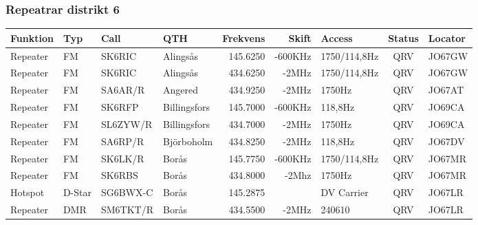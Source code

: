 \begin{landscape}
\subsubsection{Repeatrar distrikt 6}
\footnotesize
\begin{longtable}{llllrrlcl}
	\textbf{Funktion}         & \textbf{Typ}  & \textbf{Call} & \textbf{QTH}        & \textbf{Frekvens} & \textbf{Skift} & \textbf{Access}  & \textbf{Status} & \textbf{Locator} \\ \hline
	\endhead
	Repeater                  & FM            & SK6RIC        & Alingsås            & 145.6250          & -600KHz        & 1750/114,8Hz     & QRV             & JO67GW           \\
	Repeater                  & FM            & SK6RIC        & Alingsås            & 434.6250          & -2MHz          & 1750/114,8Hz     & QRV             & JO67GW           \\
	Repeater                  & FM            & SA6AR/R       & Angered             & 434.9250          & -2MHz          & 1750Hz           & QRV             & JO67AT           \\
	Repeater                  & FM            & SK6RFP        & Billingsfors        & 145.7000          & -600KHz        & 118,8Hz          & QRV             & JO69CA           \\
	Repeater                  & FM            & SL6ZYW/R      & Billingsfors        & 434.7000          & -2MHz          & 1750Hz           & QRV             & JO69CA           \\
	Repeater                  & FM            & SA6RP/R       & Björboholm          & 434.8250          & -2MHz          & 118,8Hz          & QRV             & JO67DV           \\
	Repeater                  & FM            & SK6LK/R       & Borås               & 145.7750          & -600KHz        & 1750/114,8Hz     & QRV             & JO67MR           \\
	Repeater                  & FM            & SK6RBS        & Borås               & 434.8000          & -2Mhz          & 1750Hz           & QRV             & JO67MR           \\
	Hotspot                   & D-Star        & SG6BWX-C      & Borås               & 145.2875          &                & DV Carrier       & QRV             & JO67LR           \\
	Repeater                  & DMR           & SM6TKT/R      & Borås               & 434.5500          & -2MHz          & 240610           & QRV             & JO67LR           \\

\end{longtable}
\end{landscape}
